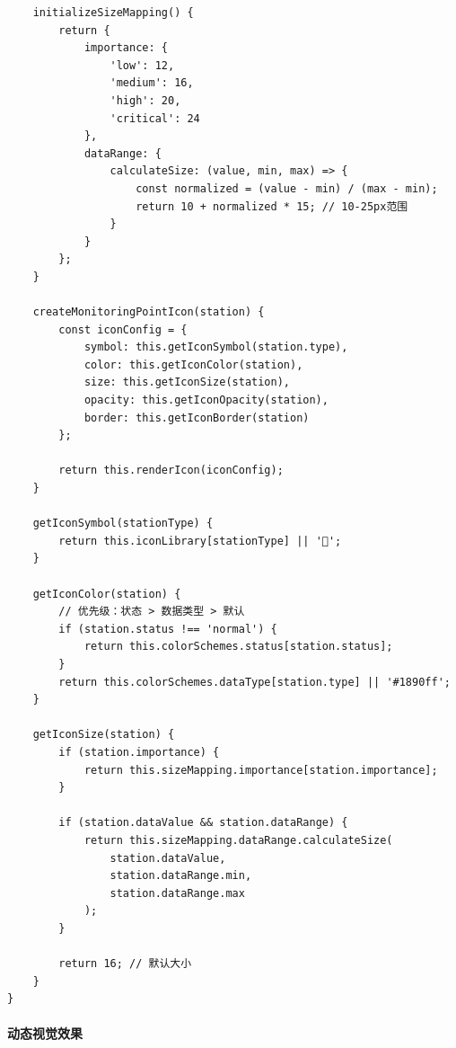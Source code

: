 \begin{lstlisting}
    initializeSizeMapping() {
        return {
            importance: {
                'low': 12,
                'medium': 16,
                'high': 20,
                'critical': 24
            },
            dataRange: {
                calculateSize: (value, min, max) => {
                    const normalized = (value - min) / (max - min);
                    return 10 + normalized * 15; // 10-25px范围
                }
            }
        };
    }
    
    createMonitoringPointIcon(station) {
        const iconConfig = {
            symbol: this.getIconSymbol(station.type),
            color: this.getIconColor(station),
            size: this.getIconSize(station),
            opacity: this.getIconOpacity(station),
            border: this.getIconBorder(station)
        };
        
        return this.renderIcon(iconConfig);
    }
    
    getIconSymbol(stationType) {
        return this.iconLibrary[stationType] || '📍';
    }
    
    getIconColor(station) {
        // 优先级：状态 > 数据类型 > 默认
        if (station.status !== 'normal') {
            return this.colorSchemes.status[station.status];
        }
        return this.colorSchemes.dataType[station.type] || '#1890ff';
    }
    
    getIconSize(station) {
        if (station.importance) {
            return this.sizeMapping.importance[station.importance];
        }
        
        if (station.dataValue && station.dataRange) {
            return this.sizeMapping.dataRange.calculateSize(
                station.dataValue,
                station.dataRange.min,
                station.dataRange.max
            );
        }
        
        return 16; // 默认大小
    }
}
\end{lstlisting}

\paragraph{动态视觉效果}\label{ux52a8ux6001ux89c6ux89c9ux6548ux679c}

